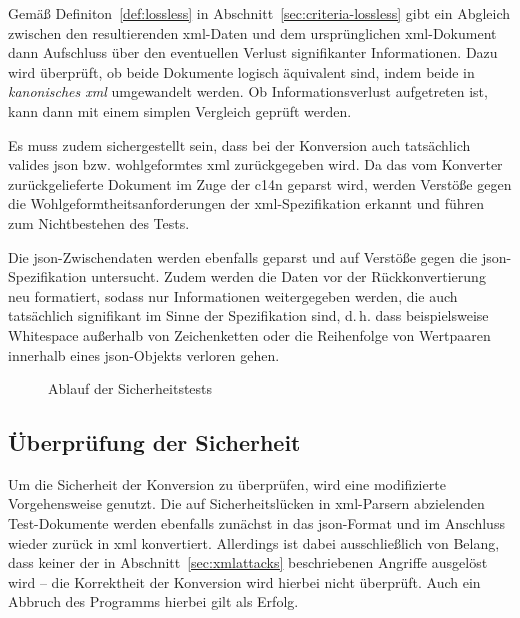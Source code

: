 Gemäß Definiton~\ref{def:lossless} in Abschnitt~\ref{sec:criteria-lossless} gibt ein Abgleich zwischen den resultierenden \acrshort{xml}-Daten und dem ursprünglichen \acrshort{xml}-Dokument dann Aufschluss über den eventuellen Verlust signifikanter Informationen. Dazu wird überprüft, ob beide Dokumente logisch äquivalent sind, indem beide in \emph{kanonisches \acrshort{xml}} umgewandelt werden. Ob Informationsverlust aufgetreten ist, kann dann mit einem simplen Vergleich geprüft werden.

Es muss zudem sichergestellt sein, dass bei der Konversion auch tatsächlich valides \acrshort{json} bzw. wohlgeformtes \acrshort{xml} zurückgegeben wird. Da das vom Konverter zurückgelieferte Dokument im Zuge der \acrlong{c14n} geparst wird, werden Verstöße gegen die Wohlgeformtheitsanforderungen der \acrshort{xml}-Spezifikation erkannt und führen zum Nichtbestehen des Tests.

Die \acrshort{json}-Zwischendaten werden ebenfalls geparst und auf Verstöße gegen die \acrshort{json}-Spezifikation untersucht. Zudem werden die Daten vor der Rückkonvertierung neu formatiert, sodass nur Informationen weitergegeben werden, die auch tatsächlich signifikant im Sinne der Spezifikation sind, d.\,h. dass beispielsweise Whitespace außerhalb von Zeichenketten oder die Reihenfolge von Wertpaaren innerhalb eines \acrshort{json}-Objekts verloren gehen.

\begin{figure}[b!]
    \begin{center}
        
        \caption{Ablauf der Sicherheitstests}
    \end{center}
\end{figure}

\subsection{Überprüfung der Sicherheit}
\label{sec:method-sec}

Um die Sicherheit der Konversion zu überprüfen, wird eine modifizierte Vorgehensweise genutzt. Die auf Sicherheitslücken in \acrshort{xml}-Parsern abzielenden Test-Dokumente werden ebenfalls zunächst in das \acrshort{json}-Format und im Anschluss wieder zurück in \acrshort{xml} konvertiert. Allerdings ist dabei ausschließlich von Belang, dass keiner der in Abschnitt~\ref{sec:xmlattacks} beschriebenen Angriffe ausgelöst wird -- die Korrektheit der Konversion wird hierbei nicht überprüft. Auch ein Abbruch des Programms hierbei gilt als Erfolg.

